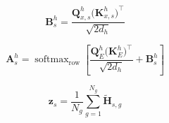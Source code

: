 \documentclass[12pt]{article}
\begin{document}
\[
\bm B_s^{h}
=
\frac{\bm Q_{x,s}^{h}\bigl(\bm K_{x,s}^{h}\bigr)^{\!\top}}
     {\sqrt{2d_h}}
\]

\newpage

\[
\bm A_s^{h}
=
\operatorname{softmax}_{\mathrm{row}}\!\left[
\frac{\bm Q_E^{h}\bigl(\bm K_E^{h}\bigr)^{\!\top}}
     {\sqrt{2d_h}}
+\bm B_s^{h}
\right]
\]

\newpage

\[
\bm z_s
=\frac{1}{N_g}\sum_{g=1}^{N_g}\widetilde{\bm H}_{s,g}
\]
\end{document}
